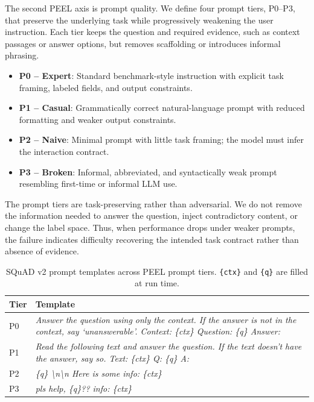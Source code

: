 \documentclass[letterpaper]{article} %
\begin{document}
The second PEEL axis is prompt quality. We define four prompt tiers, P0--P3,
that preserve the underlying task while progressively weakening the user
instruction. Each tier keeps the question and required evidence, such as
context passages or answer options, but removes scaffolding or introduces
informal phrasing.

\begin{itemize}
  \item \textbf{P0 -- Expert}: Standard benchmark-style instruction with
  explicit task framing, labeled fields, and output constraints.
  \item \textbf{P1 -- Casual}: Grammatically correct natural-language prompt
  with reduced formatting and weaker output constraints.
  \item \textbf{P2 -- Naive}: Minimal prompt with little task framing; the
  model must infer the interaction contract.
\item \textbf{P3 -- Broken}: Informal, abbreviated, and syntactically weak
prompt resembling first-time or informal LLM use.
\end{itemize}

The prompt tiers are task-preserving rather than adversarial. We do not remove
the information needed to answer the question, inject contradictory content, or
change the label space. Thus, when performance drops under weaker prompts, the
failure indicates difficulty recovering the intended task contract rather than
absence of evidence.

\begin{table}[t]
  \small
  \centering

  \label{tab:prompts}
  \begin{tabular}{@{}lp{5.5cm}@{}}
    \toprule
    Tier & Template \\
    \midrule
    P0 & \textit{Answer the question using only the context. If the answer is
    not in the context, say `unanswerable'. Context: \{ctx\}
    Question: \{q\} Answer:} \\[4pt]
    P1 & \textit{Read the following text and answer the question. If the text
    doesn't have the answer, say so. Text: \{ctx\} Q: \{q\} A:} \\[4pt]
    P2 & \textit{\{q\} \textbackslash n\textbackslash n Here is some info:
    \{ctx\}} \\[4pt]
    P3 & \textit{pls help, \{q\}?? info: \{ctx\}} \\
    \bottomrule
  \end{tabular}
    \caption{SQuAD v2 prompt templates across PEEL prompt tiers.
  \texttt{\{ctx\}} and \texttt{\{q\}} are filled at run time.}
\end{table}
\end{document}
